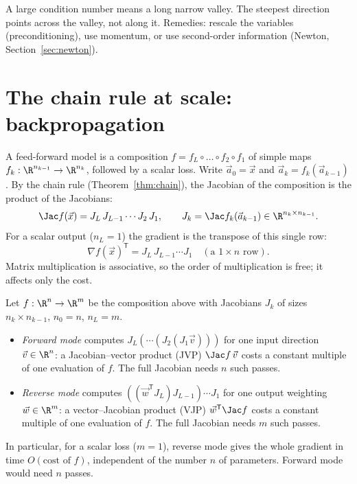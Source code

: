 \begin{intuition}
A large condition number means a long narrow valley. The steepest direction points across the valley, not along it. Remedies: rescale the variables (preconditioning), use momentum, or use second-order information (Newton, Section~\ref{sec:newton}).
\end{intuition}

\section{The chain rule at scale: backpropagation}

A feed-forward model is a composition $f=f_L\circ\dots\circ f_2\circ f_1$ of simple maps $f_k:\R^{n_{k-1}}\to\R^{n_k}$, followed by a scalar loss. Write $\vec a_0=\vec x$ and $\vec a_k=f_k(\vec a_{k-1})$. By the chain rule (Theorem~\ref{thm:chain}), the Jacobian of the composition is the product of the Jacobians:
\[
\Jac f(\vec x)=J_L\,J_{L-1}\cdots J_2\,J_1,\qquad J_k=\Jac f_k(\vec a_{k-1})\in\R^{n_k\times n_{k-1}} .
\]
For a scalar output ($n_L=1$) the gradient is the transpose of this single row:
\[
\nabla f(\vec x)^{\mathsf T}=J_L\,J_{L-1}\cdots J_1\quad(\text{a }1\times n\text{ row}).
\]
Matrix multiplication is associative, so the order of multiplication is free; it affects only the cost.

\begin{theorem}\label{thm:adcost}
Let $f:\R^n\to\R^m$ be the composition above with Jacobians $J_k$ of sizes $n_k\times n_{k-1}$, $n_0=n$, $n_L=m$.
\begin{itemize}
  \item \emph{Forward mode} computes $J_L(\cdots(J_2(J_1\vec v)))$ for one input direction $\vec v\in\R^n$: a Jacobian--vector product (JVP) $\Jac f\,\vec v$ costs a constant multiple of one evaluation of $f$. The full Jacobian needs $n$ such passes.
  \item \emph{Reverse mode} computes $((\vec w^{\mathsf T}J_L)J_{L-1})\cdots J_1$ for one output weighting $\vec w\in\R^m$: a vector--Jacobian product (VJP) $\vec w^{\mathsf T}\Jac f$ costs a constant multiple of one evaluation of $f$. The full Jacobian needs $m$ such passes.
\end{itemize}
In particular, for a scalar loss ($m=1$), reverse mode gives the whole gradient in time $O(\text{cost of $f$})$, independent of the number $n$ of parameters. Forward mode would need $n$ passes.
\end{theorem}

